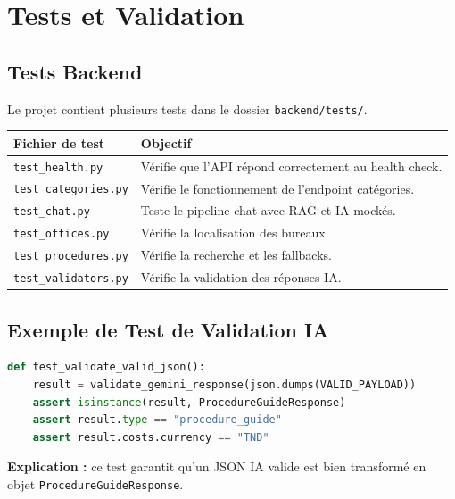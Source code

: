 \documentclass[12pt,a4paper]{report}
\begin{document}

\chapter{Tests et Validation}

\section{Tests Backend}

Le projet contient plusieurs tests dans le dossier \texttt{backend/tests/}.

\begin{longtable}{|p{4cm}|p{10cm}|}
\hline
\textbf{Fichier de test} & \textbf{Objectif} \\
\hline
\endhead
\texttt{test\_health.py} & Vérifie que l'API répond correctement au health check. \\
\hline
\texttt{test\_categories.py} & Vérifie le fonctionnement de l'endpoint catégories. \\
\hline
\texttt{test\_chat.py} & Teste le pipeline chat avec RAG et IA mockés. \\
\hline
\texttt{test\_offices.py} & Vérifie la localisation des bureaux. \\
\hline
\texttt{test\_procedures.py} & Vérifie la recherche et les fallbacks. \\
\hline
\texttt{test\_validators.py} & Vérifie la validation des réponses IA. \\
\hline
\end{longtable}

\section{Exemple de Test de Validation IA}

\begin{lstlisting}[language=Python,caption={Test de validation d'une réponse IA}]
def test_validate_valid_json():
    result = validate_gemini_response(json.dumps(VALID_PAYLOAD))
    assert isinstance(result, ProcedureGuideResponse)
    assert result.type == "procedure_guide"
    assert result.costs.currency == "TND"
\end{lstlisting}

\textbf{Explication :} ce test garantit qu'un JSON IA valide est bien transformé en objet \texttt{ProcedureGuideResponse}.

\end{document}
